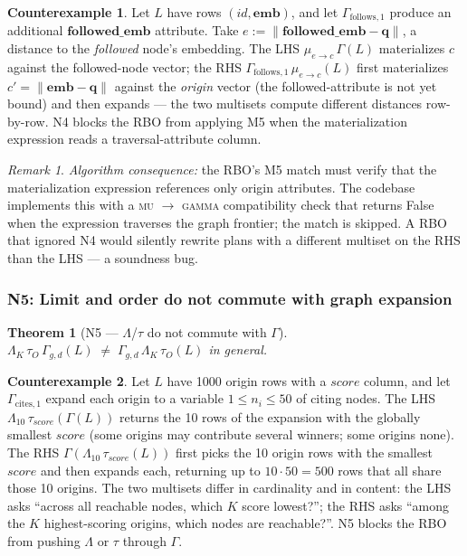 \documentclass[sigconf,nonacm,review]{acmart}
\theoremstyle{plain}
\newtheorem{theorem}{Theorem}
\theoremstyle{definition}
\newtheorem{counterexample}{Counterexample}
\newcommand{\vect}[1]{\boldsymbol{#1}}
\theoremstyle{remark}
\newtheorem{remark}{Remark}
\begin{document}
\begin{counterexample}\label{ce:n4}
Let $L$ have rows $(\mathit{id}, \vect{emb})$, and let
$\Gamma_{\mathrm{follows},1}$ produce an additional
$\vect{followed\_emb}$ attribute. Take
$e := \lVert \vect{followed\_emb} - \vect{q} \rVert$, a
distance to the \emph{followed} node's embedding. The LHS
$\mu_{e \to c}\,\Gamma(L)$ materializes $c$ against the
followed-node vector; the RHS
$\Gamma_{\mathrm{follows},1}\,\mu_{e \to c}(L)$ first
materializes $c' = \lVert \vect{emb} - \vect{q} \rVert$
against the \emph{origin} vector (the followed-attribute is
not yet bound) and then expands --- the two multisets compute
different distances row-by-row. N4 blocks the RBO from
applying M5 when the materialization expression reads a
traversal-attribute column.
\end{counterexample}

\begin{remark}
\emph{Algorithm consequence:} the RBO's M5 match must verify
that the materialization expression references only origin
attributes. The codebase implements this with a
\textsc{mu} $\to$ \textsc{gamma} compatibility check that
returns False when the expression traverses the graph
frontier; the match is skipped. A RBO that ignored N4 would
silently rewrite plans with a different multiset on the RHS
than the LHS --- a soundness bug.
\end{remark}

\subsubsection{N5: Limit and order do not commute with graph expansion}

\begin{theorem}[N5 --- $\Lambda$/$\tau$ do not commute with $\Gamma$]\label{thm:n5}
$\Lambda_K\, \tau_O\, \Gamma_{g, d}(L) \;\neq\;
\Gamma_{g, d}\, \Lambda_K\, \tau_O(L)$ in general.
\end{theorem}

\begin{counterexample}\label{ce:n5}
Let $L$ have 1000 origin rows with a $\mathit{score}$
column, and let $\Gamma_{\mathrm{cites},1}$ expand each
origin to a variable $1 \leq n_i \leq 50$ of citing nodes.
The LHS $\Lambda_{10}\, \tau_{\mathit{score}}(\Gamma(L))$
returns the 10 rows of the expansion with the globally
smallest $\mathit{score}$ (some origins may contribute
several winners; some origins none). The RHS
$\Gamma(\Lambda_{10}\, \tau_{\mathit{score}}(L))$ first picks
the 10 origin rows with the smallest $\mathit{score}$ and
then expands each, returning up to $10 \cdot 50 = 500$ rows
that all share those 10 origins. The two multisets differ in
cardinality and in content: the LHS asks ``across all
reachable nodes, which $K$ score lowest?''; the RHS asks
``among the $K$ highest-scoring origins, which nodes are
reachable?''. N5 blocks the RBO from pushing $\Lambda$ or
$\tau$ through $\Gamma$.
\end{counterexample}
\end{document}
